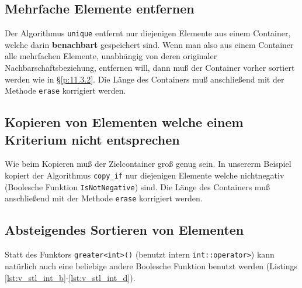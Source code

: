 \subsection{Mehrfache Elemente entfernen}
\label{p:11.3.3}
Der Algorithmus \verb|unique| entfernt nur diejenigen Elemente aus einem Container, 
welche darin \textbf{benachbart} gespeichert sind. 
Wenn man also aus einem Container alle mehrfachen Elemente, unabhängig von deren originaler Nachbarschaftsbeziehung, 
entfernen will, dann muß der Container vorher sortiert werden wie in \S\ref{p:11.3.2}.
Die Länge des Containers muß anschließend mit der Methode \verb|erase| korrigiert werden.
%
%
%

%
%
\subsection{Kopieren von Elementen welche einem Kriterium nicht entsprechen}
\label{p:11.3.4}
Wie beim Kopieren muß der Zielcontainer groß genug sein.
In unsererm Beispiel kopiert der Algorithmus 
\verb|copy_if| 
nur diejenigen Elemente welche nichtnegativ 
(Boolesche Funktion \verb|IsNotNegative|) sind. 
Die Länge des Containers muß anschließend mit der Methode \verb|erase| korrigiert werden.
%
%
%
%
%

%
%
\subsection{Absteigendes Sortieren von Elementen}
\label{p:11.3.5}
%
%
%
%
Statt des Funktors \verb|greater<int>()| (benutzt intern \verb|int::operator>|) kann 
natürlich auch eine beliebige andere Boolesche Funktion benutzt werden 
(Listings \ref{lst:v_stl_int_b}-\ref{lst:v_stl_int_d}).

